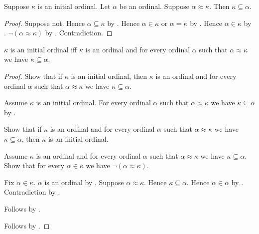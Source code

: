 \begin{theorem}\label{initial_ordinal_le_equinumerous_ordinal}
    Suppose $\kappa$ is an initial ordinal.
    Let $\alpha$ be an ordinal.
    Suppose $\alpha\approx\kappa$.
    Then $\kappa\subseteq\alpha$.
\end{theorem}
\begin{proof}
    Suppose not.
    Hence $\alpha\subseteq\kappa$
        by .
    Hence $\alpha\in\kappa$ or $\alpha=\kappa$
        by .
    Hence $\alpha\in\kappa$ by .
    $\lnot(\alpha\approx\kappa)$ by .
    Contradiction.
\end{proof}

\begin{proposition}\label{initial_ordinal_characterization}
    $\kappa$ is an initial ordinal iff $\kappa$ is an ordinal and
        for every ordinal $\alpha$ such that $\alpha\approx\kappa$
            we have $\kappa\subseteq\alpha$.
\end{proposition}
\begin{proof}
    Show that if $\kappa$ is an initial ordinal, then $\kappa$ is an
        ordinal and for every ordinal $\alpha$ such that
        $\alpha\approx\kappa$ we have $\kappa\subseteq\alpha$.
    \begin{subproof}
        Assume $\kappa$ is an initial ordinal.
        For every ordinal $\alpha$ such that $\alpha\approx\kappa$
            we have $\kappa\subseteq\alpha$
            by .
    \end{subproof}
    Show that if $\kappa$ is an ordinal and for every ordinal $\alpha$
        such that $\alpha\approx\kappa$ we have
        $\kappa\subseteq\alpha$, then $\kappa$ is an initial ordinal.
    \begin{subproof}
        Assume $\kappa$ is an ordinal and for every ordinal $\alpha$
            such that $\alpha\approx\kappa$ we have
            $\kappa\subseteq\alpha$.
        Show that for every $\alpha\in\kappa$ we have
            $\lnot(\alpha\approx\kappa)$.
        \begin{subproof}
            Fix $\alpha\in\kappa$.
            $\alpha$ is an ordinal by .
            Suppose $\alpha\approx\kappa$.
            Hence $\kappa\subseteq\alpha$.
            Hence $\alpha\in\alpha$ by .
            Contradiction by .
        \end{subproof}
        Follows by .
    \end{subproof}
    Follows by \auto.
\end{proof}

